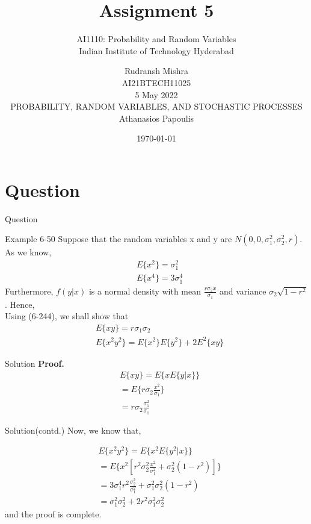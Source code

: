 \documentclass{beamer}
\title{Assignment 5}
\subtitle{\Large AI1110: Probability and Random Variables \\ \large Indian Institute of Technology Hyderabad}
\author{Rudransh Mishra \\ \normalsize AI21BTECH11025 \\ \vspace*{20pt} \normalsize  5 May 2022 \\ \vspace*{20pt} PROBABILITY, RANDOM VARIABLES, AND STOCHASTIC PROCESSES\\ \normalsize Athanasios Papoulis}
\date{\today}
\begin{document}
\begin{frame}
    \titlepage 
\end{frame}

\logo{}


\section{Question}
\begin{frame}{Question}
    \begin{block}{Example 6-50}
Suppose that the random variables x and y are $N(0,0,\sigma _1 ^2,\sigma _2 ^2, r)$. As we know,
\begin {align}
  & E\{x^2\}=\sigma _1 ^2\\
  & E\{x^4\}=3 \sigma _1 ^4 
\end {align}
Furthermore, $f (y  | x)$ is a normal density with mean $\frac {r \sigma _2 x}{\sigma _1}$ and variance $\sigma _2 \sqrt {1 - r^2}$. Hence,\\

Using (6-244), we shall show that
\begin {align}
  &E\{xy\} = r\sigma _1\sigma _2\\
  &E\{x^2 y^2\} = E\{x^2\}E\{y^2\} + 2E^2\{xy\}
\end {align}
    \end{block}
\end{frame}

\begin{frame}{Solution}
\textbf{Proof.}
\begin {align}
&E\{xy\} =E\{xE\{y|x\}\} \\
&=E\{r \sigma_2 \frac{x^ 2} {\sigma_1} \} \\
&=r \sigma_2 \frac{\sigma_1 ^ 2}{\sigma_1}
\end {align}
\end{frame}
\begin{frame}{Solution(contd.)}
Now, we know that,

\begin {align}
&E\{x^ 2 y^ 2 \} =E\{x^ 2 E\{y^ 2 |x\} \}\\ 
&=E\{x^ 2 [r^ 2 \sigma_2 ^ 2\frac{ x^ 2} {\sigma_1 ^ 2} + \sigma_2 ^ 2 (1-r^ 2 )]\}\\
&=3 \sigma_1 ^ 4 r^ 2 \frac{\sigma_2 ^ 2} {\sigma_1 ^ 2} + \sigma_1 ^ 2 \sigma_2 ^ 2 (1-r^ 2 )\\
&= \sigma_1 ^ 2 \sigma_2 ^ 2 +2r^ 2 \sigma_1 ^ 2 \sigma_2 ^ 2
\end {align}
and the proof is complete.
\end{frame}
\end{document}
